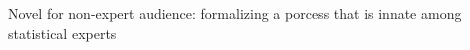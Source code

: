 Novel for non-expert audience: formalizing a porcess that is innate among statistical experts

\begin{comment}

Despite the goal to lower the
barriers to statistical specification, at some point, 

Another approach to explore in the
future may be to eliminate the need to engage analysts in disambiguation and
instead execute all possible statistical models given an input, likely
ambiguous, conceptual model. Although this approach would accomplish a different
objective than the goal here of compiling a specific conceptual model into a
specific statistical model, this approach may give greater insight into the need 

robustnes of a particular effect in light of many possible conceptual models and
explanations.


In the future, there could be additional exploration into authoring a multiverse
of all possible statistical models given a specific ambiguous conceptual model.
This would accomplish a different objective than the goal of \tisane (and
\rTisane), which is to compile a specific conceptual model into a specific
statistical model for/with the end-user. The multiverse would help assess the
robustnes of a particular effect in light of many possible conceptual models and
explanations.

Concretely, it
took us several iterations to answer the question: What is the right point to
introduce cycle breaking and modeling to the end-user? 

**not remove all complexity but rather focus end-users on necessary complexity
and guide their thinking/help them navigate that complexity. 

\end{comment}